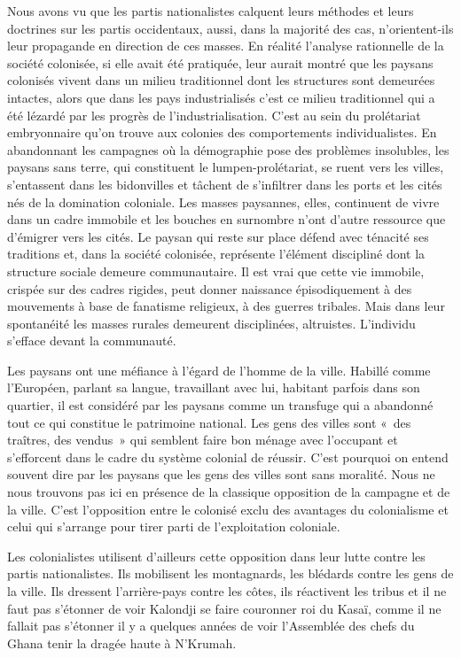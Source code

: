 \documentclass[french,twoside]{book} %
\begin{document}
\noindent Nous avons vu que les partis nationalistes calquent leurs méthodes et leurs doctrines sur les partis occidentaux, aussi, dans la majorité des cas, n’orientent-ils leur propagande en direction de ces masses. En réalité l’analyse rationnelle de la société colonisée, si elle avait été pratiquée, leur aurait montré que les paysans colonisés vivent dans un milieu traditionnel dont les structures sont demeurées intactes, alors que dans les pays industrialisés c’est ce milieu traditionnel qui a été lézardé par les progrès de l’industrialisation. C’est au sein du prolétariat embryonnaire qu’on trouve aux colonies des comportements individualistes. En abandonnant les campagnes où la démographie pose des problèmes insolubles, les paysans sans terre, qui   constituent le lumpen-prolétariat, se ruent vers les villes, s’entassent dans les bidonvilles et tâchent de s’infiltrer dans les ports et les cités nés de la domination coloniale. Les masses paysannes, elles, continuent de vivre dans un cadre immobile et les bouches en surnombre n’ont d’autre ressource que d’émigrer vers les cités. Le paysan qui reste sur place défend avec ténacité ses traditions et, dans la société colonisée, représente l’élément discipliné dont la structure sociale demeure communautaire. Il est vrai que cette vie immobile, crispée sur des cadres rigides, peut donner naissance épisodiquement à des mouvements à base de fanatisme religieux, à des guerres tribales. Mais dans leur spontanéité les masses rurales demeurent disciplinées, altruistes. L’individu s’efface devant la communauté.\par
Les paysans ont une méfiance à l’égard de l’homme de la ville. Habillé comme l’Européen, parlant sa langue, travaillant avec lui, habitant parfois dans son quartier, il est considéré par les paysans comme un transfuge qui a abandonné tout ce qui constitue le patrimoine national. Les gens des villes sont « des traîtres, des vendus » qui semblent faire bon ménage avec l’occupant et s’efforcent dans le cadre du système colonial de réussir. C’est pourquoi on entend souvent dire par les paysans que les gens des villes sont sans moralité. Nous ne nous trouvons pas ici en présence de la classique opposition de la campagne et de la ville. C’est l’opposition entre le colonisé exclu des avantages du colonialisme et celui qui s’arrange pour tirer parti de l’exploitation coloniale.\par
Les colonialistes utilisent d’ailleurs cette opposition dans leur lutte contre les partis nationalistes. Ils mobilisent les montagnards, les blédards contre les gens de la ville. Ils dressent l’arrière-pays contre les côtes, ils réactivent les tribus et il ne faut pas s’étonner de voir Kalondji se faire couronner roi du Kasaï, comme il ne fallait pas s’étonner il y a quelques années de voir l’Assemblée des chefs du Ghana tenir la dragée haute à N’Krumah.\par
\end{document}
